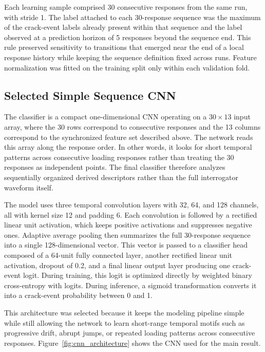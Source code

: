\documentclass[notspecified,article,submit,pdftex,moreauthors]{Definitions/mdpi}
\newcommand{\rev}[1]{{\color{red}#1}}
\begin{document}
Each learning sample comprised 30 consecutive responses from the same run, with stride 1. The label attached to each 30-response sequence was the maximum of the crack-event labels already present within that sequence and the label observed at a prediction horizon of 5 responses beyond the sequence end. This rule preserved sensitivity to transitions that emerged near the end of a local response history while keeping the sequence definition fixed across runs. Feature normalization was fitted on the training split only within each validation fold.

\subsection{Selected Simple Sequence CNN}

The classifier is a compact one-dimensional CNN operating on a $30\times13$ input array, where the 30 rows correspond to consecutive responses and the 13 columns correspond to the synchronized feature set described above. The network reads this array along the response order. In other words, it looks for short temporal patterns across consecutive loading responses rather than treating the 30 responses as independent points. \rev{The final classifier therefore analyzes sequentially organized derived descriptors rather than the full interrogator waveform itself.}

The model uses three temporal convolution layers with 32, 64, and 128 channels, all with kernel size 12 and padding 6. Each convolution is followed by a rectified linear unit activation, which keeps positive activations and suppresses negative ones. Adaptive average pooling then summarizes the full 30-response sequence into a single 128-dimensional vector. This vector is passed to a classifier head composed of a 64-unit fully connected layer, another rectified linear unit activation, dropout of 0.2, and a final linear output layer producing one crack-event logit. During training, this logit is optimized directly by weighted binary cross-entropy with logits. During inference, a sigmoid transformation converts it into a crack-event probability between 0 and 1.

This architecture was selected because it keeps the modeling pipeline simple while still allowing the network to learn short-range temporal motifs such as progressive drift, abrupt jumps, or repeated loading patterns across consecutive responses. Figure~\ref{fig:cnn_architecture} shows the CNN used for the main result.
\end{document}
